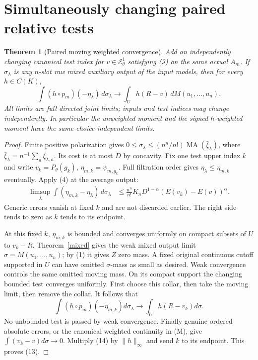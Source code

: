 \documentclass[11pt]{article}
\newtheorem{theorem}{Theorem}
\newcommand{\MA}{\operatorname{MA}}
\newcommand{\EE}{\mathcal E^1_\theta}
\begin{document}
\section{Simultaneously changing paired relative tests}
\begin{theorem}[Paired moving weighted convergence]\label{weighted}
Add an independently changing canonical test index for
$v\in\EE$ satisfying (9) on the same actual $A_m$.
If $\sigma_\lambda$ is any $n$-slot raw mixed auxiliary output
of the input models, then for every $h\in C(K)$,
\[
 \int (h\circ p_m)(-\eta_\lambda)\,d\sigma_\lambda
 \longrightarrow
 \int_U h(R-v)\,dM(u_1,\ldots,u_n).                     \tag{13}
\]
All limits are full directed joint limits; inputs and test indices
may change independently. In particular the unweighted moment
and the signed $h$-weighted moment have the same choice-independent
limits.
\end{theorem}
\begin{proof}
Finite positive polarization gives
$0\leq\sigma_\lambda\leq(n^n/n!)\MA(\bar\xi_\lambda)$,
where $\bar\xi_\lambda=n^{-1}\sum_a\xi_{\lambda,a}$.
Its cost is at most $D$ by concavity.
Fix one test upper index $k$ and write
$v_k=P_\theta(g_k)$, $\eta_{m,k}=\psi_{m,g_k}$.
Full filtration order gives $\eta_\lambda\leq\eta_{m,k}$
eventually. Apply (4) at the average output:
\[
\begin{split}
\limsup_\lambda
 \int(\eta_{m,k}-\eta_\lambda)\,d\sigma_\lambda
 &\leq\frac{n^n}{n!}K_nD^{1-\alpha}
                      (E(v_k)-E(v))^\alpha .
\end{split}                                             \tag{14}
\]
Generic errors vanish at fixed $k$ and are not discarded earlier.
The right side tends to zero as $k$ tends to its endpoint.

At this fixed $k$, $\eta_{m,k}$ is bounded and converges
uniformly on compact subsets of $U$ to $v_k-R$.
Theorem~\ref{mixed} gives the weak mixed output limit
$\sigma=M(u_1,\ldots,u_n)$; by (1) it gives $Z$ zero mass.
A fixed original continuous cutoff supported in $U$ can have
omitted $\sigma$-mass as small as desired.
Weak convergence controls the same omitted moving mass.
On its compact support the changing bounded test converges uniformly.
First choose this collar, then take the moving limit, then remove
the collar. It follows that
\[
 \int(h\circ p_m)(-\eta_{m,k})d\sigma_\lambda
       \longrightarrow\int_Uh(R-v_k)d\sigma .
\]
No unbounded test is passed by weak convergence.
Finally genuine ordered absolute errors, or the canonical weighted
continuity in (M), give
$\int(v_k-v)d\sigma\to0$.
Multiply (14) by $\|h\|_\infty$ and send $k$ to its endpoint.
This proves (13).
\end{proof}
\end{document}
